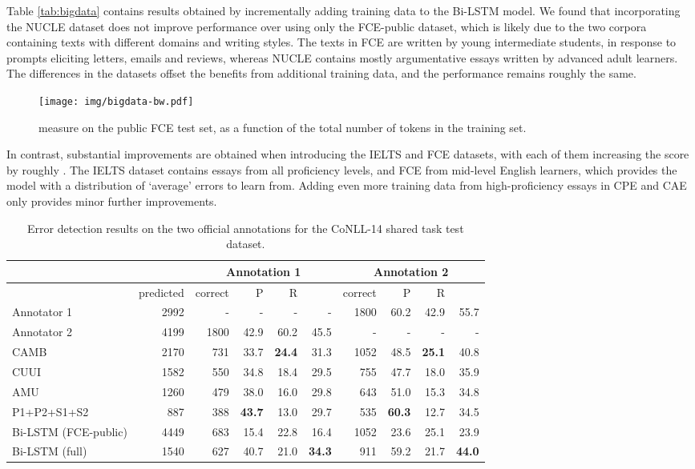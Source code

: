 \documentclass[11pt]{article}
\begin{document}
Table \ref{tab:bigdata} contains results obtained by incrementally adding training data to the Bi-LSTM model.
We found that incorporating the NUCLE dataset does not improve performance over using only the FCE-public dataset, which is likely due to the two corpora containing texts with different domains and writing styles.
The texts in FCE are written by young intermediate students, in response to prompts eliciting letters, emails and reviews, whereas NUCLE contains mostly argumentative essays written by advanced adult learners.
The differences in the datasets offset the benefits from additional training data, and the performance remains roughly the same.

\begin{figure}[h]
	\texttt{[image: img/bigdata-bw.pdf]}
	\caption{ measure on the public FCE test set, as a function of the total number of tokens in the training set.}
	\label{fig:bigdata}
\end{figure}

In contrast, substantial improvements are obtained when introducing the IELTS and FCE datasets, with each of them increasing the  score by roughly .
The IELTS dataset contains essays from all proficiency levels, and FCE from mid-level English learners, which provides the model with a distribution of `average' errors to learn from. Adding even more training data from high-proficiency essays in CPE and CAE only provides minor further improvements.




\begin{table*}
\begin{tabular}{lr|rrrr|rrrr} \toprule
 &  & \multicolumn{4}{c|}{Annotation 1} & \multicolumn{4}{c}{Annotation 2} \\ \midrule
 & predicted & correct & P & R &  & correct & P & R &  \\ \midrule
Annotator 1 & 2992 & - & - & - & - & 1800 & 60.2 & 42.9 & 55.7 \\
Annotator 2 & 4199 & 1800 & 42.9 & 60.2 & 45.5 & - & - & - & - \\ \midrule
CAMB & 2170 & 731 & 33.7 & \textbf{24.4} & 31.3 & 1052 & 48.5 & \textbf{25.1} & 40.8 \\
CUUI & 1582 & 550 & 34.8 & 18.4 & 29.5 & 755 & 47.7 & 18.0 & 35.9 \\
AMU  & 1260 & 479 & 38.0 & 16.0 & 29.8 & 643 & 51.0 & 15.3 & 34.8 \\
P1+P2+S1+S2 & 887 & 388 & \textbf{43.7} & 13.0 & 29.7 & 535 & \textbf{60.3} & 12.7 & 34.5 \\ \midrule
Bi-LSTM (FCE-public) & 4449 & 683 & 15.4 & 22.8 & 16.4 & 1052 & 23.6 & 25.1 & 23.9  \\
Bi-LSTM (full) & 1540 & 627 & 40.7 & 21.0 & \textbf{34.3} & 911 & 59.2 & 21.7 & \textbf{44.0} \\ \bottomrule
\end{tabular}
\caption{Error detection results on the two official annotations for the CoNLL-14 shared task test dataset.}
\label{tab:conll}
\end{table*}
\end{document}
